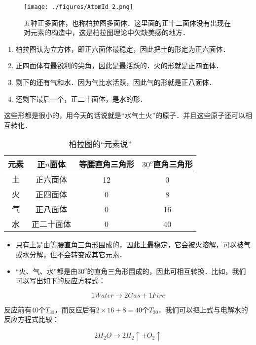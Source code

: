 \begin{figure}[ht]
\centering
\texttt{[image: ./figures/AtomId\_2.png]}
\caption{五种正多面体，也称柏拉图多面体．这里面的正十二面体没有出现在对元素的构造中，这是柏拉图理论中欠缺美感的地方．} \label{AtomId_fig2}
\end{figure}

\begin{enumerate}
\item 柏拉图认为立方体，即正六面体最稳定，因此把土的形定为正六面体．
\item 正四面体有最锐利的尖角，因此是最活跃的．火的形就是正四面体．
\item 剩下的还有气和水．因为气比水活跃，因此气的形就是正八面体．
\item 还剩下最后一个，正二十面体，是水的形．
\end{enumerate}

这些形都是很小的，用今天的话说就是“水气土火”的原子．并且这些原子还可以相互转化．

\begin{table}[ht]
\centering
\caption{柏拉图的“元素说”}\label{AtomId_tab1}
\begin{tabular}{|c|c|c|c|}
\hline
元素 & 正$n$面体 & 等腰直角三角形 & $30^o$直角三角形 \\
\hline
土 & 正六面体 & 12 & 0  \\
\hline
火 & 正四面体 & 0 & 8 \\
\hline
气 & 正八面体 & 0 & 16 \\
\hline
水 & 正二十面体 & 0 & 40\\
\hline
\end{tabular}
\end{table}

\begin{itemize}
\item 只有土是由等腰直角三角形围成的，因此土最稳定，它会被火溶解，可以被气或水分解，但不会转变成其它元素．

\item “火、气、水”都是由$30^o$的直角三角形围成的，因此可相互转换．比如，我们可以写出如下的反应方程式：
\end{itemize}

\begin{equation}
1 Water \to 2 Gas + 1 Fire 
\end{equation}

反应前有40个$T_{30}$，而反应后有$2 \times 16 + 8 = 40$个$T_{30}$．我们可以把上式与电解水的反应方程式比较：

\begin{equation}
2 H_2 O \to 2 H_2 \uparrow + O_2 \uparrow
\end{equation}

